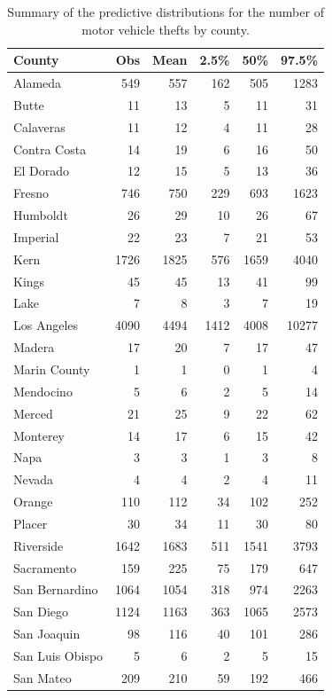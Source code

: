\documentclass{asaproc}
\begin{document}
\begin{table}[p!]
\caption{\enspace Summary of the predictive distributions for the number of motor vehicle thefts by county.}
\centering
\begin{tabular}{lrrrrr}
\\ [-5pt]
County & Obs & Mean & 2.5\% & 50\% & 97.5\% \\ 
  \hline
Alameda & 549 & 557 & 162 & 505 & 1283 \\ 
  Butte & 11 & 13 & 5 & 11 & 31 \\ 
  Calaveras & 11 & 12 & 4 & 11 & 28 \\ 
  Contra Costa & 14 & 19 & 6 & 16 & 50 \\ 
  El Dorado & 12 & 15 & 5 & 13 & 36 \\ 
  Fresno & 746 & 750 & 229 & 693 & 1623 \\ 
  Humboldt & 26 & 29 & 10 & 26 & 67 \\ 
  Imperial & 22 & 23 & 7 & 21 & 53 \\ 
  Kern & 1726 & 1825 & 576 & 1659 & 4040 \\ 
  Kings & 45 & 45 & 13 & 41 & 99 \\ 
  Lake & 7 & 8 & 3 & 7 & 19 \\ 
  Los Angeles & 4090 & 4494 & 1412 & 4008 & 10277 \\ 
  Madera & 17 & 20 & 7 & 17 & 47 \\ 
  Marin County & 1 & 1 & 0 & 1 & 4 \\ 
  Mendocino & 5 & 6 & 2 & 5 & 14 \\ 
  Merced & 21 & 25 & 9 & 22 & 62 \\ 
  Monterey & 14 & 17 & 6 & 15 & 42 \\ 
  Napa & 3 & 3 & 1 & 3 & 8 \\ 
  Nevada & 4 & 4 & 2 & 4 & 11 \\ 
  Orange & 110 & 112 & 34 & 102 & 252 \\ 
  Placer & 30 & 34 & 11 & 30 & 80 \\ 
  Riverside & 1642 & 1683 & 511 & 1541 & 3793 \\ 
  Sacramento & 159 & 225 & 75 & 179 & 647 \\ 
  San Bernardino & 1064 & 1054 & 318 & 974 & 2263 \\ 
  San Diego & 1124 & 1163 & 363 & 1065 & 2573 \\ 
  San Joaquin & 98 & 116 & 40 & 101 & 286 \\ 
  San Luis Obispo & 5 & 6 & 2 & 5 & 15 \\ 
  San Mateo & 209 & 210 & 59 & 192 & 466 \\ 

\end{tabular}
\end{table}
\end{document}
